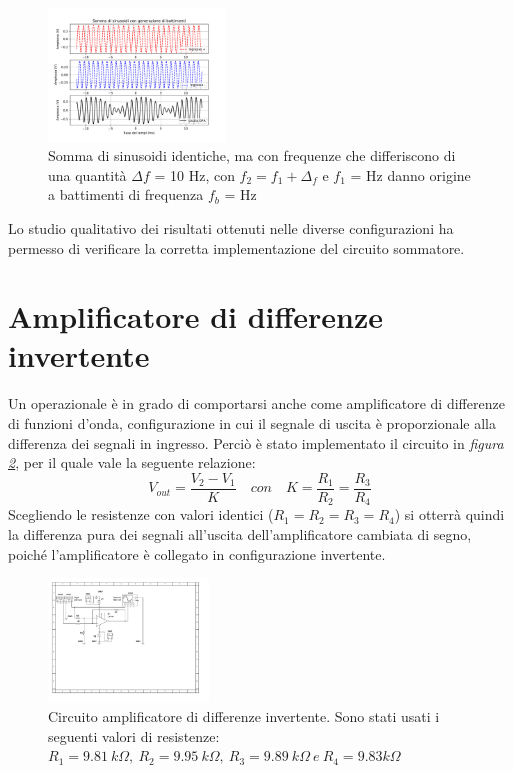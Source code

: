 \documentclass[journal]{IEEEtran}
\begin{document}
\begin{figure}[H]%
\begin {center}
\includegraphics[width=0.42\textwidth]{analysis/output/OPA_mixer_beats.pdf}
\caption{Somma di sinusoidi identiche, ma con frequenze che differiscono di una quantità $\Delta f$ = 10 Hz, con $f_2 = f_1 + \Delta_f$ e $f_1$ = Hz  danno origine a battimenti di frequenza $f_b$ = Hz}
\label{fig:beats}
\end {center}
\end{figure}

Lo studio qualitativo dei risultati ottenuti nelle diverse configurazioni ha permesso di verificare la corretta implementazione del circuito sommatore. 

\section{Amplificatore di differenze invertente \label{par:differenze}} %

Un operazionale è in grado di comportarsi anche come amplificatore di differenze di funzioni d'onda, configurazione in cui il segnale di uscita è proporzionale alla differenza dei segnali in ingresso. Perciò è stato implementato il circuito in \textit{figura  \ref{fig:differenze}}, per il quale vale la seguente relazione: 
\[V_{out} =\frac{V_2 - V_1}{K} \quad con \quad K = \frac{R_1}{R_2}=\frac{R_3}{R_4} \tag{2} \] 
Scegliendo le resistenze con valori identici ($R_1 = R_2 = R_3 =R_4 $) si otterrà quindi la differenza pura dei segnali all'uscita dell'amplificatore cambiata di segno, poiché l'amplificatore è collegato in configurazione invertente.

\begin{figure}[H]%
\begin {center}
\includegraphics[width=0.38\textwidth]{sch-simulations/output/OPA-difference-amp.pdf}
\caption{Circuito amplificatore di differenze invertente. Sono stati usati i seguenti valori di resistenze: $R_1 =9.81\ k\Omega, \ R_2 = 9.95\ k\Omega ,\ R_3 = 9.89\ k\Omega \ e \ R_4 = 9.83 k\Omega  $  }
\label{fig:differenze}
\end {center}
\end{figure}
\end{document}
